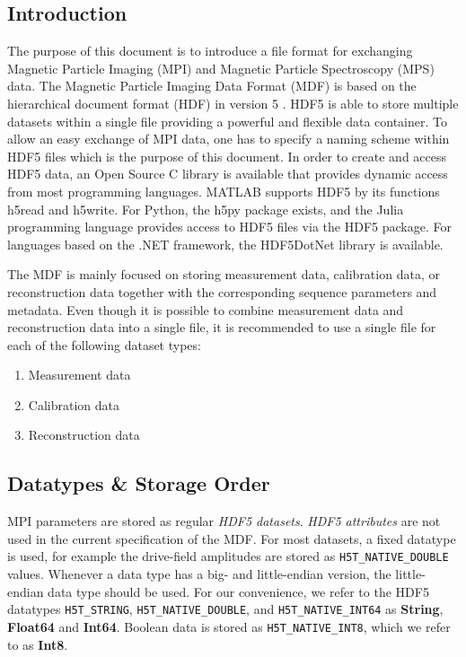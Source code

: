 \documentclass[landscape,a4paper]{article} %
\newcommand{\inl}[1]{\lstinline[columns=fixed]{#1}}
\newcommand{\inltab}[1]{{\ttfamily\bfseries\color{blue}#1}}
\newcommand{\inlvar}[1]{{\ttfamily#1}}
\begin{document}
\begin{multicols}{2}		

\section{Introduction} \label{Sec:Introduction}

The purpose of this document is to introduce a file format for exchanging Magnetic Particle Imaging (MPI) and Magnetic Particle Spectroscopy (MPS) data. The Magnetic Particle Imaging Data Format (MDF) is based on the hierarchical document format (HDF) in version 5 \cite{hdf5}. HDF5 is able to store multiple datasets within a single file providing a powerful and flexible data container. To allow an easy exchange of MPI data, one has to specify a naming scheme within HDF5 files which is the purpose of this document. In order to create and access HDF5 data, an Open Source C library is available that provides dynamic access from most programming languages. MATLAB supports HDF5 by its functions \inlvar{h5read} and \inlvar{h5write}. For Python, the \inlvar{h5py} package exists, and the Julia programming language provides access to HDF5 files via the \inlvar{HDF5} package. For languages based on the .NET framework, the \inlvar{HDF5DotNet} library is available.

The MDF is mainly focused on storing measurement data, calibration data, or reconstruction data together with the corresponding sequence parameters and metadata. Even though it is possible to combine measurement data and reconstruction data into a single file, it is recommended to use a single file for each of the following dataset types:
\begin{enumerate}
\setlength{\itemsep}{0pt}
\item Measurement data
\item Calibration data
\item Reconstruction data
\end{enumerate}

\subsection{Datatypes \& Storage Order}

MPI parameters are stored as regular \textit{HDF5 datasets}. \textit{HDF5 attributes} are not used in the current specification of the MDF. For most datasets, a fixed datatype is used, for example the drive-field amplitudes are stored as \inl{H5T_NATIVE_DOUBLE} values. Whenever a data type has a big- and little-endian version, the little-endian data type should be used. For our convenience, we refer to the HDF5 datatypes \inl{H5T_STRING}, \inl{H5T_NATIVE_DOUBLE}, and \inl{H5T_NATIVE_INT64} as \inltab{String}, \inltab{Float64} and \inltab{Int64}. Boolean data is stored as \inl{H5T_NATIVE_INT8}, which we refer to as \inltab{Int8}. 


\end{multicols}
\end{document}
